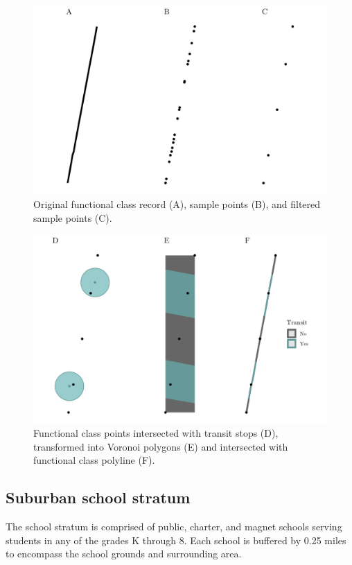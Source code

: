 \documentclass[paper=letterpaper, fontsize=11pt]{scrartcl}
\begin{document}
\FloatBarrier
\begin{figure}[!htbp]
	\centering
	\includegraphics[width=5in]{segmentize-abc.png}
	\caption{Original functional class record (A), sample points (B), and filtered sample points (C).} \label{segmentize1}
\end{figure}
\FloatBarrier

\FloatBarrier
\begin{figure}[!htbp]
	\centering
	\includegraphics[width=5in]{segmentize-def.png}
	\caption{Functional class points intersected with transit stops (D), transformed into Voronoi polygons (E) and intersected with functional class polyline (F).} \label{segmentize2}
\end{figure}
\FloatBarrier

\subsection{Suburban school stratum}
The school stratum is comprised of public, charter, and magnet schools serving students in any of the grades K through 8. Each school is buffered by 0.25 miles to encompass the school grounds and surrounding area.
\end{document}
